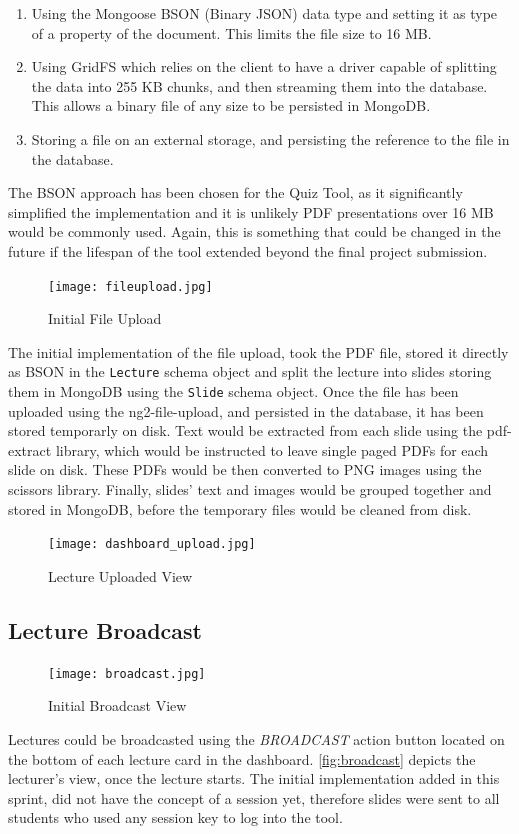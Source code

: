 \begin{enumerate}
  \item Using the Mongoose BSON (Binary JSON)\cite{49} data type and setting it as type of a property of the document.
    This limits the file size to 16 MB.
  \item Using GridFS\cite{50} which relies on the client to have a driver capable of splitting the data into 255 KB
    chunks, and then streaming them into the database. This allows a binary file of any size to be persisted
    in MongoDB.
  \item Storing a file on an external storage, and persisting the reference to the file in the database.
\end{enumerate}

The BSON approach has been chosen for the Quiz Tool, as it significantly simplified the implementation and it is
unlikely PDF presentations over 16 MB would be commonly used. Again, this is something that could be changed
in the future if the lifespan of the tool extended beyond the final project submission.

\begin{figure}[h!]
    \centering
    \texttt{[image: fileupload.jpg]}
    \caption{Initial File Upload}
    \label{fig:initialfileupload}
\end{figure}

The initial implementation of the file upload, took the PDF file, stored it directly as BSON in the
\texttt{Lecture} schema object and split the lecture into slides storing them in MongoDB using
the \texttt{Slide} schema object. Once the file has been uploaded using the ng2-file-upload\cite{51},
and persisted in the database, it has been stored temporarly on disk. Text would be extracted from
each slide using the pdf-extract\cite{52} library, which would be instructed to leave single paged
PDFs for each slide on disk. These PDFs would be then converted to PNG images using the scissors\cite{53}
library. Finally, slides' text and images would be grouped together and stored in MongoDB, before the
temporary files would be cleaned from disk.

\begin{figure}[ht]
    \centering
    \texttt{[image: dashboard\_upload.jpg]}
    \caption{Lecture Uploaded View}
    \label{fig:dashboarduploaded}
\end{figure}

\subsection{Lecture Broadcast}
\label{subsection:lecturebroadcast}
\begin{figure}[h!]
    \centering
    \texttt{[image: broadcast.jpg]}
    \caption{Initial Broadcast View}
    \label{fig:broadcast}
\end{figure}
Lectures could be broadcasted using the \textit{BROADCAST} action button located on the bottom
of each lecture card in the dashboard. \autoref{fig:broadcast} depicts the lecturer's view,
once the lecture starts. The initial implementation added in this sprint, did not have the
concept of a session yet, therefore slides were sent to all students who used any session key
to log into the tool.

